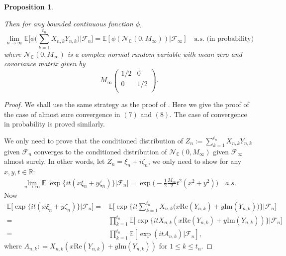 \documentclass[12pt]{amsart}
\newtheorem{proposition}[theorem]{Proposition}
\theoremstyle{definition}
\theoremstyle{remark}
\newcommand{\C}{\mathbb{C}}
\numberwithin{equation}{section}
\begin{document}
\begin{proposition}
\begin{itemize}
\end{itemize}
Then for any bounded continuous function $\phi$,
\[
\lim_{n\rightarrow\infty}\mathbb{E}\Big[\phi\Big(\sum_{k=1}^{t_n} X_{n,k}Y_{n,k}\Big) \big|\mathcal{F}_n\Big]=\mathbb{E}\left[\phi(\mathcal{N}_\C(0, M_{\infty}))| \mathcal{F}_\infty\right]\quad \text{a.s. (in probability)}
\]
where $\mathcal{N}_\C(0, M_{\infty})$ is a complex normal random variable with mean zero and covariance matrix given by 
\[
M_\infty\begin{pmatrix}
1/2&0\\
0&1/2\\
\end{pmatrix}.
\]
\end{proposition}



\begin{proof}
We shall use the same strategy as the proof of  \cite[Theorem 3.4.10]{Rick-Durrett}. Here we give the proof of the case of almost sure convergence in $(7)$ and $(8)$. The case of   convergence in probability is proved similarly. 

We only need to prove that the  conditioned distribution of $Z_n:=\sum_{k=1}^{t_n} X_{n,k}Y_{n,k}$ given $\mathcal{F}_n$ converges to the conditioned distribution of $\mathcal{N}_\C(0, M_\infty)$ given $\mathcal{F}_\infty$ almost surely. In other words, let $Z_n=\xi_n+i \zeta_n$, we only need to show for any $x,y, t\in\mathbb{R}$: 
\begin{align}\label{eqn-desired}
\lim_{n\rightarrow\infty}\mathbb{E}\big[\exp\{it(x\xi_n+y\zeta_n)\}\big| \mathcal{F}_n\big]=\exp\Big(-\frac{1}{2}\frac{M_\infty}{2}t^2(x^2+y^2)\Big) \quad a.s.
\end{align}
Now 
\begin{align*}
\mathbb{E}\big[\exp\{it(x\xi_n+y\zeta_n)\}\big| \mathcal{F}_n\big]=&\mathbb{E}\Big[\exp\Big\{it\sum_{k=1}^{t_n}X_{n,k}\big(x\mathrm{Re}(Y_{n,k})+y\mathrm{Im}(Y_{n,k})\big)\Big\}\big| \mathcal{F}_n\Big]\\
=&\prod_{k=1}^{t_n}\mathbb{E} \Big[\exp \Big\{itX_{n,k}(x\mathrm{Re}(Y_{n,k})+y\mathrm{Im}(Y_{n,k})) \Big\} \big| \mathcal{F}_n\Big]\\
=&\prod_{k=1}^{t_n}\mathbb{E}[\exp( itA_{n,k}) | \mathcal{F}_n],
\end{align*}
where  $A_{n,k}: =X_{n,k} (x\mathrm{Re}(Y_{n,k})+y\mathrm{Im}(Y_{n,k}) )$ for $1\leq k\leq t_n$. 




\end{proof}
\end{document}
